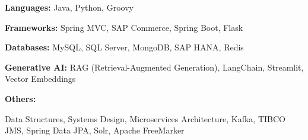 \begin{cvskills}

  \cvskill
    {\bf Languages:}
    { Java, Python, Groovy}

  \cvskill
    {\bf Frameworks:}
    {Spring MVC, SAP Commerce, Spring Boot, Flask}

  \cvskill
    {\bf Databases:}
    {MySQL, SQL Server, MongoDB, SAP HANA, Redis}

  \cvskill
    {\bf Generative AI:}
    {RAG (Retrieval-Augmented Generation), LangChain, Streamlit, Vector Embeddings}

  \cvskill
    {\bf Others:}
    {\parbox[t]{0.95\linewidth}{Data Structures, Systems Design, Microservices Architecture, Kafka, TIBCO JMS, Spring Data JPA, Solr, Apache FreeMarker}}

\end{cvskills}
